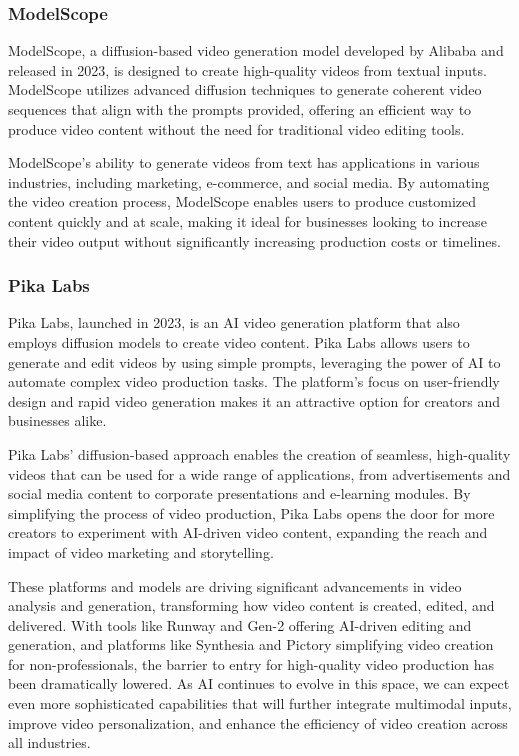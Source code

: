 \subsubsection{ModelScope}

ModelScope, a diffusion-based video generation model developed by Alibaba and released in 2023, is designed to create high-quality videos from textual inputs. 
ModelScope utilizes advanced diffusion techniques to generate coherent video sequences that align with the prompts provided, offering an efficient way to produce video content without the need for traditional video editing tools.

ModelScope's ability to generate videos from text has applications in various industries, including marketing, e-commerce, and social media. 
By automating the video creation process, ModelScope enables users to produce customized content quickly and at scale, making it ideal for businesses looking to increase their video output without significantly increasing production costs or timelines.

\subsubsection{Pika Labs}

Pika Labs, launched in 2023, is an AI video generation platform that also employs diffusion models to create video content. 
Pika Labs allows users to generate and edit videos by using simple prompts, leveraging the power of AI to automate complex video production tasks. 
The platform's focus on user-friendly design and rapid video generation makes it an attractive option for creators and businesses alike.

Pika Labs’ diffusion-based approach enables the creation of seamless, high-quality videos that can be used for a wide range of applications, from advertisements and social media content to corporate presentations and e-learning modules. 
By simplifying the process of video production, Pika Labs opens the door for more creators to experiment with AI-driven video content, expanding the reach and impact of video marketing and storytelling.

These platforms and models are driving significant advancements in video analysis and generation, transforming how video content is created, edited, and delivered. 
With tools like Runway and Gen-2 offering AI-driven editing and generation, and platforms like Synthesia and Pictory simplifying video creation for non-professionals, the barrier to entry for high-quality video production has been dramatically lowered. 
As AI continues to evolve in this space, we can expect even more sophisticated capabilities that will further integrate multimodal inputs, improve video personalization, and enhance the efficiency of video creation across all industries.

